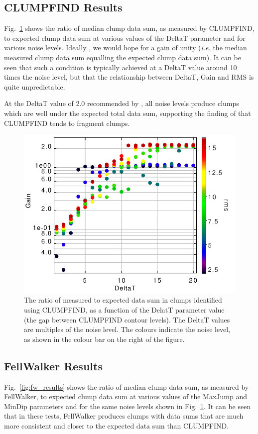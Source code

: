 \documentclass[final,authoryear,5p,times,twocolumn]{elsarticle}
\begin{document}
\subsection{CLUMPFIND Results}
Fig.~\ref{fig:cf_results} shows the ratio of median clump data sum, as
measured by CLUMPFIND, to expected clump data sum at various values of
the DeltaT parameter and for various noise levels. Ideally , we would
hope for a gain of unity (\emph{i.e.} the median measured clump data sum
equalling the expected clump data sum). It can be seen that such a
condition is typically achieved at a DeltaT value around 10 times the
noise level, but that the relationship between DeltaT, Gain and RMS is
quite unpredictable.

At the DeltaT value of 2.0 recommended by \cite{1994Williams}, all noise
levels produce clumps which are well under the expected total data sum,
supporting the finding of \cite{2010Watson} that CLUMPFIND tends to
fragment clumps.

\begin{figure}
\includegraphics[width=\columnwidth]{comp4_cf}
\caption{The ratio of measured to expected data sum in clumps identified
using CLUMPFIND, as a function of the DelatT parameter value (the gap
between CLUMPFIND contour levels). The DeltaT values are multiples of the
noise level. The colours indicate the noise level, as shown in the colour
bar on the right of the figure.}
\label{fig:cf_results}
\end{figure}


\subsection{FellWalker Results}
Fig.~\ref{fig:fw_results} shows the ratio of median clump data sum, as
measured by FellWalker, to expected clump data sum at various values of
the MaxJump and MinDip parameters and for the same noise levels shown in
Fig.~\ref{fig:cf_results}. It can be seen that in these tests, FellWalker
produces clumps with data sums that are much more consistent and closer
to the expected data sum than CLUMPFIND.
\end{document}
